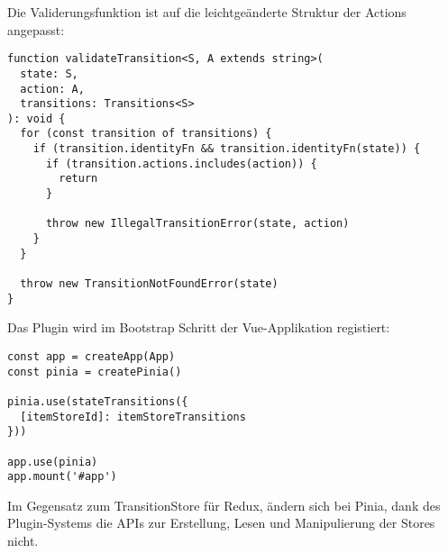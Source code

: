 Die Validerungsfunktion ist auf die leichtgeänderte Struktur der Actions angepasst:

\begin{lstlisting}
function validateTransition<S, A extends string>(
  state: S,
  action: A,
  transitions: Transitions<S>
): void {
  for (const transition of transitions) {
    if (transition.identityFn && transition.identityFn(state)) {
      if (transition.actions.includes(action)) {
        return
      }

      throw new IllegalTransitionError(state, action)
    }
  }

  throw new TransitionNotFoundError(state)
}
\end{lstlisting}

Das Plugin wird im Bootstrap Schritt der Vue-Applikation registiert:

\begin{lstlisting}
const app = createApp(App)
const pinia = createPinia()

pinia.use(stateTransitions({
  [itemStoreId]: itemStoreTransitions
}))

app.use(pinia)
app.mount('#app')
\end{lstlisting}

Im Gegensatz zum TransitionStore für Redux, ändern sich bei Pinia, dank des Plugin-Systems die APIs zur Erstellung, Lesen und Manipulierung der Stores nicht.